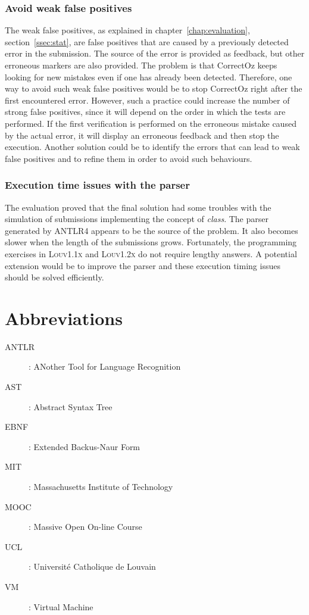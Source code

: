 \documentclass[11pt,a4paper,twoside,openright]{report}
\begin{document}
\subsection{Avoid weak false positives}
The weak false positives, as explained in chapter~\ref{chap:evaluation}, 
section~\ref{ssec:stat}, are false 
positives that are caused by a previously detected error in the submission. The 
source of the error is provided as feedback, but other erroneous markers are 
also provided. The problem is that CorrectOz keeps looking for new mistakes even 
if one has already been detected. Therefore, one way to avoid such weak false 
positives would be to stop CorrectOz right after the first encountered error. 
However, such a practice could increase the number of strong false positives, 
since it will depend on the order in which the tests are performed. If the first 
verification is performed on the erroneous mistake caused by the actual 
error, it will display an erroneous feedback and then stop the execution. 
Another solution could be to identify the errors that can lead to weak false 
positives and to refine them in order to avoid such behaviours.

\subsection{Execution time issues with the parser}
The evaluation proved that the final solution had some troubles with the 
simulation of submissions implementing the concept of \textit{class}. The 
parser generated by \textsc{ANTLR4} appears to be the source of the problem. 
It also becomes slower when the length of the submissions grows. 
Fortunately, the programming exercises in \textsc{Louv1.1x} and 
\textsc{Louv1.2x} do not require lengthy answers. A potential extension would 
be to improve the parser and these execution timing issues should be solved 
efficiently.

\chapter{Abbreviations}

\begin{description}
  \item[ANTLR]: ANother Tool for Language Recognition
  \item[AST]: Abstract Syntax Tree
  \item[EBNF]:  Extended Backus-Naur Form
  \item[MIT]: Massachusetts Institute of Technology
  \item[MOOC]: Massive Open On-line Course
  \item[UCL]: Université Catholique de Louvain
  \item[VM]: Virtual Machine
\end{description}
\end{document}
